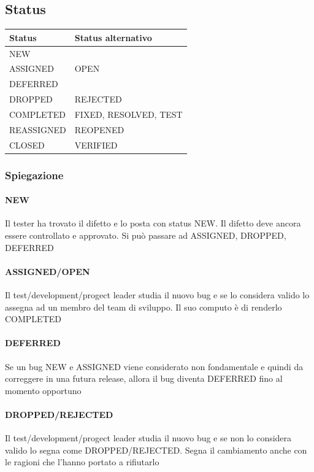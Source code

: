 \documentclass[11pt,a4paper]{book}
\begin{document}
\subsection{Status}
\begin{table}[]
\begin{tabular}{|l|l|}
\hline
\textbf{Status} & \textbf{Status alternativo} \\ \hline
NEW             &                             \\ \hline
ASSIGNED        & OPEN                        \\ \hline
DEFERRED        &                             \\ \hline
DROPPED         & REJECTED                    \\ \hline
COMPLETED       & FIXED, RESOLVED, TEST       \\ \hline
REASSIGNED      & REOPENED                    \\ \hline
CLOSED          & VERIFIED                    \\ \hline
\end{tabular}
\end{table}

\subsubsection{Spiegazione}
\paragraph{NEW}
Il tester ha trovato il difetto e lo posta con status NEW. Il difetto deve ancora essere controllato e approvato. Si può passare ad ASSIGNED, DROPPED, DEFERRED
\paragraph{ASSIGNED/OPEN}
Il test/development/progect leader studia il nuovo bug e se lo considera valido lo assegna ad un membro del team di sviluppo. Il suo computo è di renderlo COMPLETED
\paragraph{DEFERRED}
Se un bug NEW e ASSIGNED viene considerato non fondamentale e quindi da correggere in una futura release, allora il bug diventa DEFERRED fino al momento opportuno
\paragraph{DROPPED/REJECTED}
Il test/development/progect leader studia il nuovo bug e se non lo considera valido lo segna come DROPPED/REJECTED. Segna il cambiamento anche con le ragioni che l'hanno portato a rifiutarlo
\end{document}
